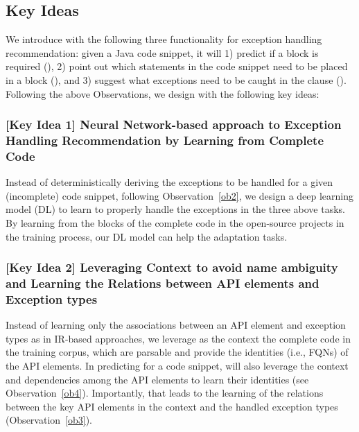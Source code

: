 \subsection{Key Ideas}
\label{key:sec}

We introduce {\tool} with the following three functionality for
exception handling recommendation: given a Java code snippet, it will
1) predict if a  block is required ({\xblock}), 2)
point out which statements in the code snippet need to be placed in a
 block ({\xstate}), and 3) suggest what exceptions
need to be caught in the  clause ({\xtype}). Following the
above Observations, we design {\tool} with the following key ideas:

\subsubsection{{\bf [Key Idea 1] Neural Network-based approach to Exception Handling Recommendation by Learning from Complete Code}}
Instead of deterministically deriving the exceptions to be handled for
a given (incomplete) code snippet, following Observation~\ref{ob2}, we
design a deep learning model (DL) to learn to properly handle the
exceptions in the three above tasks.
By learning from the  blocks of the complete code in
the open-source projects in the training process, our DL model can
help the adaptation tasks.




\vspace{2pt}
\subsubsection{{\bf [Key Idea 2] Leveraging Context to avoid
name ambiguity and Learning the Relations between API elements and
Exception types}} Instead of learning only the associations between an
API element and exception types as in IR-based approaches,
we leverage as the context the complete code in the training
corpus, which are parsable and provide the identities (i.e., FQNs) of
the API elements. In predicting for a code snippet, {\tool} will also
leverage the context and dependencies among the API elements to learn
their identities (see Observation~\ref{ob4}). Importantly,
that leads to the learning of the relations between the key API
elements in the context and the handled exception types
(Observation~\ref{ob3}).

